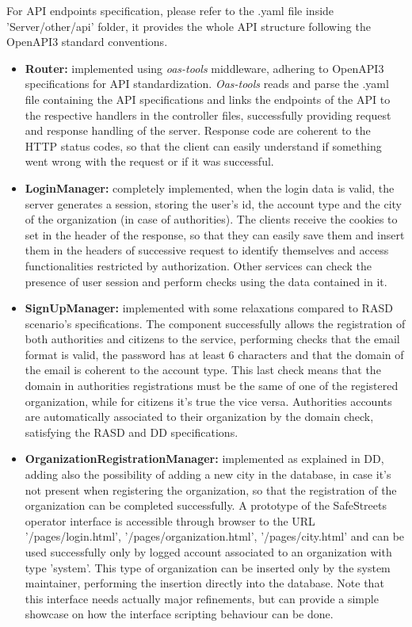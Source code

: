 For API endpoints specification, please refer to the .yaml file inside 'Server/other/api' folder, it provides the whole API structure following the OpenAPI3 standard conventions.

\begin{itemize}
	\item \textbf{Router:} implemented using \textit{oas-tools} middleware, adhering to OpenAPI3 specifications for API standardization. \textit{Oas-tools} reads and parse the .yaml file containing the API specifications and links the endpoints of the API to the respective handlers in the controller files, successfully providing request and response handling of the server. Response code are coherent to the HTTP status codes, so that the client can easily understand if something went wrong with the request or if it was successful.
	
	\item \textbf{LoginManager:} completely implemented, when the login data is valid, the server generates a session, storing the user's id, the account type and the city of the organization (in case of authorities). The clients receive the cookies to set in the header of the response, so that they can easily save them and insert them in the headers of successive request to identify themselves and access functionalities restricted by authorization. Other services can check the presence of user session and perform checks using the data contained in it.
	
	\item \textbf{SignUpManager:} implemented with some relaxations compared to RASD scenario's specifications. The component successfully allows the registration of both authorities and citizens to the service, performing checks that the email format is valid, the password has at least 6 characters and that the domain of the email is coherent to the account type. This last check means that the domain in authorities registrations must be the same of one of the registered organization, while for citizens it's true the vice versa. Authorities accounts are automatically associated to their organization by the domain check, satisfying the RASD and DD specifications.
	
	\item \textbf{OrganizationRegistrationManager:} implemented as explained in DD, adding also the possibility of adding a new city in the database, in case it's not present when registering the organization, so that the registration of the organization can be completed successfully. A prototype of the SafeStreets operator interface is accessible through browser to the URL '/pages/login.html', '/pages/organization.html', '/pages/city.html' and can be used successfully only by logged account associated to an organization with type 'system'. This type of organization can be inserted only by the system maintainer, performing the insertion directly into the database. Note that this interface needs actually major refinements, but can provide a simple showcase on how the interface scripting behaviour can be done.
	

\end{itemize}

